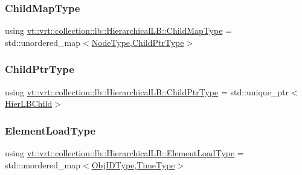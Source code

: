 \subsubsection{\texorpdfstring{Child\+Map\+Type}{ChildMapType}}
{\footnotesize\ttfamily using \hyperlink{structvt_1_1vrt_1_1collection_1_1lb_1_1_hierarchical_l_b_a95e5a93033703216cad8ec7a3da7a2ef}{vt\+::vrt\+::collection\+::lb\+::\+Hierarchical\+L\+B\+::\+Child\+Map\+Type} =  std\+::unordered\+\_\+map$<$\hyperlink{namespacevt_a866da9d0efc19c0a1ce79e9e492f47e2}{Node\+Type},\hyperlink{structvt_1_1vrt_1_1collection_1_1lb_1_1_hierarchical_l_b_a4dd8525145427a29350a287a777655de}{Child\+Ptr\+Type}$>$}

\mbox{\label{structvt_1_1vrt_1_1collection_1_1lb_1_1_hierarchical_l_b_a4dd8525145427a29350a287a777655de}} 
\subsubsection{\texorpdfstring{Child\+Ptr\+Type}{ChildPtrType}}
{\footnotesize\ttfamily using \hyperlink{structvt_1_1vrt_1_1collection_1_1lb_1_1_hierarchical_l_b_a4dd8525145427a29350a287a777655de}{vt\+::vrt\+::collection\+::lb\+::\+Hierarchical\+L\+B\+::\+Child\+Ptr\+Type} =  std\+::unique\+\_\+ptr$<$\hyperlink{structvt_1_1vrt_1_1collection_1_1lb_1_1_hier_l_b_child}{Hier\+L\+B\+Child}$>$}

\mbox{\label{structvt_1_1vrt_1_1collection_1_1lb_1_1_hierarchical_l_b_ae63d1ddb968e51d0c57b546bdc1d08c7}} 
\subsubsection{\texorpdfstring{Element\+Load\+Type}{ElementLoadType}}
{\footnotesize\ttfamily using \hyperlink{structvt_1_1vrt_1_1collection_1_1lb_1_1_hierarchical_l_b_ae63d1ddb968e51d0c57b546bdc1d08c7}{vt\+::vrt\+::collection\+::lb\+::\+Hierarchical\+L\+B\+::\+Element\+Load\+Type} =  std\+::unordered\+\_\+map$<$\hyperlink{structvt_1_1vrt_1_1collection_1_1lb_1_1_base_l_b_a15a2f756b59c8c2437985206b32aa403}{Obj\+I\+D\+Type},\hyperlink{namespacevt_a876a9d0cd5a952859c72de8a46881442}{Time\+Type}$>$}

